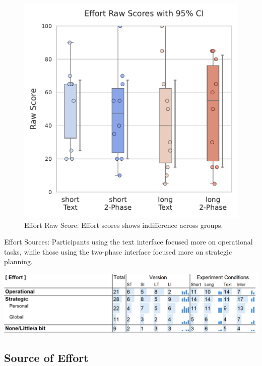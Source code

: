 \begin{figure}[h]
\begin{minipage}[t]{0.45\textwidth}
        \includegraphics[width=\textwidth, trim=0 13 0 13, clip]{content/image/cog/Effort_scores.pdf}
        \captionsetup{width=0.9\textwidth, justification=justified} %
        \caption{Effort Raw Score: Effort scores shows indifference across groups.}
        \label{fig:effort_cog_score}
    \end{minipage}
\end{figure}

\begin{table}[h]
    \caption{Effort Sources: Participants using the text interface focused more on operational tasks, while those using the two-phase interface focused more on strategic planning.}
    \label{tbl:physical}
    \includegraphics[width=\linewidth]{content/image/cog/effort_table.png}
\end{table}

\subsection{Source of Effort}
\label{sec:effort}

